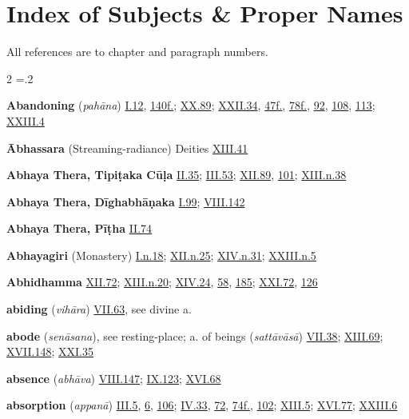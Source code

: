 \chapter[Index]{Index\* {\large of Subjects \& Proper Names}}All references are to chapter and paragraph numbers.\begin{multicols}{2}
\parskip=.2\baselineskip\RaggedRight\begin{vismHanging}
\par\textbf{Abandoning} (\emph{pahāna}) \hyperlink{I.12}{I.12}{}, \hyperlink{I.140}{140f.}{}; \hyperlink{XX.89}{XX.89}{}; \hyperlink{XXII.34}{XXII.34}{}, \hyperlink{XXII.47}{47f.}{}, \hyperlink{XXII.78}{78f.}{}, \hyperlink{XXII.92}{92}{}, \hyperlink{XXII.108}{108}{}, \hyperlink{XXII.113}{113}{}; \hyperlink{XXIII.4}{XXIII.4}{}
\par\textbf{Ābhassara} (Streaming-radiance) Deities \hyperlink{XIII.41}{XIII.41}{}
\par\textbf{Abhaya Thera, Tipiṭaka Cūḷa} \hyperlink{II.35}{II.35}{}; \hyperlink{III.53}{III.53}{}; \hyperlink{XII.89}{XII.89}{}, \hyperlink{XII.101}{101}{}; \hyperlink{XIII.n38}{XIII.n.38}{}
\par\textbf{Abhaya Thera, Dīghabhāṇaka} \hyperlink{I.99}{I.99}{}; \hyperlink{VIII.142}{VIII.142}{}
\par\textbf{Abhaya Thera, Pīṭha} \hyperlink{II.74}{II.74}{}
\par\textbf{Abhayagiri} (Monastery) \hyperlink{I.n18}{I.n.18}{}; \hyperlink{XII.n25}{XII.n.25}{}; \hyperlink{XIV.n31}{XIV.n.31}{}; \hyperlink{XXIII.n5}{XXIII.n.5}{}
\par\textbf{Abhidhamma} \hyperlink{XII.72}{XII.72}{}; \hyperlink{XIII.n20}{XIII.n.20}{}; \hyperlink{XIV.24}{XIV.24}{}, \hyperlink{XIV.58}{58}{}, \hyperlink{XIV.185}{185}{}; \hyperlink{XXI.72}{XXI.72}{}, \hyperlink{XXI.126}{126}{}
\par\textbf{abiding} (\emph{vihāra}) \hyperlink{VII.63}{VII.63}{}, see divine a.
\par\textbf{abode} (\emph{senāsana}), see resting-place; a. of beings (\emph{sattāvāsā}) \hyperlink{VII.38}{VII.38}{}; \hyperlink{XIII.69}{XIII.69}{}; \hyperlink{XVII.148}{XVII.148}{}; \hyperlink{XXI.35}{XXI.35}{}
\par\textbf{absence} (\emph{abhāva}) \hyperlink{VIII.147}{VIII.147}{}; \hyperlink{IX.123}{IX.123}{}; \hyperlink{XVI.68}{XVI.68}{}
\par\textbf{absorption} (\emph{appanā}) \hyperlink{III.5}{III.5}{}, \hyperlink{III.6}{6}{}, \hyperlink{III.106}{106}{}; \hyperlink{IV.33}{IV.33}{}, \hyperlink{IV.72}{72}{}, \hyperlink{IV.74}{74f.}{}, \hyperlink{IV.102}{102}{}; \hyperlink{XIII.5}{XIII.5}{}; \hyperlink{XVI.77}{XVI.77}{}; \hyperlink{XXIII.6}{XXIII.6}{}

\end{vismHanging}
\end{multicols}
